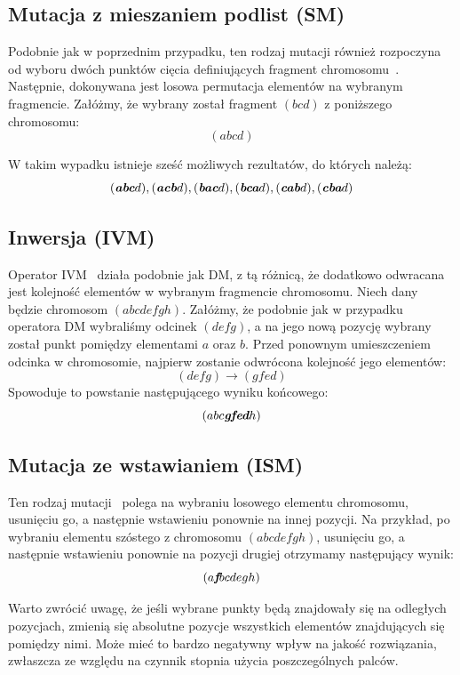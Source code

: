 \documentclass{xmgr}
\begin{document}
\subsection{Mutacja z mieszaniem podlist (SM)}

Podobnie jak w poprzednim przypadku, ten rodzaj mutacji również rozpoczyna od wyboru dwóch punktów cięcia definiujących fragment chromosomu~\cite{Syswerda}. Następnie, dokonywana jest losowa permutacja elementów na wybranym fragmencie. Załóżmy, że wybrany został fragment $(b c d)$ z poniższego chromosomu:
$$ (a b c d) $$

W takim wypadku istnieje sześć możliwych rezultatów, do których należą:
$$(\textit{\textbf{abc}} d), (\textit{\textbf{acb}} d), (\textit{\textbf{bac}} d), (\textit{\textbf{bca}} d), (\textit{\textbf{cab}} d), (\textit{\textbf{cba}} d) $$

\subsection{Inwersja (IVM)}

Operator IVM~\cite{Fogel1993} działa podobnie jak DM, z tą różnicą, że dodatkowo odwracana jest kolejność elementów w wybranym fragmencie chromosomu. Niech dany będzie chromosom $ (a b c d e f g h) $. Załóżmy, że podobnie jak w przypadku operatora DM wybraliśmy odcinek $ (d e f g) $, a na jego nową pozycję wybrany został punkt pomiędzy elementami $a$ oraz $b$. Przed ponownym umieszczeniem odcinka w chromosomie, najpierw zostanie odwrócona kolejność jego elementów:
$$ (d e f g) \rightarrow (g f e d) $$
Spowoduje to powstanie następującego wyniku końcowego:
$$ (a b c \textit{\textbf{gfed}} h) $$

\subsection{Mutacja ze wstawianiem (ISM)}

Ten rodzaj mutacji~\cite{Michalewicz:2003:AGSDPE} polega na wybraniu losowego elementu chromosomu, usunięciu go, a następnie wstawieniu ponownie na innej pozycji. Na przykład, po wybraniu elementu szóstego z chromosomu $(a b c d e f g h)$, usunięciu go, a następnie wstawieniu ponownie na pozycji drugiej otrzymamy następujący wynik:
$$ (a \textit{\textbf{f}} b c d e g h) $$

Warto zwrócić uwagę, że jeśli wybrane punkty będą znajdowały się na odległych pozycjach, zmienią się absolutne pozycje wszystkich elementów znajdujących się pomiędzy nimi. Może mieć to bardzo negatywny wpływ na jakość rozwiązania, zwłaszcza ze względu na czynnik stopnia użycia poszczególnych palców.
\end{document}
